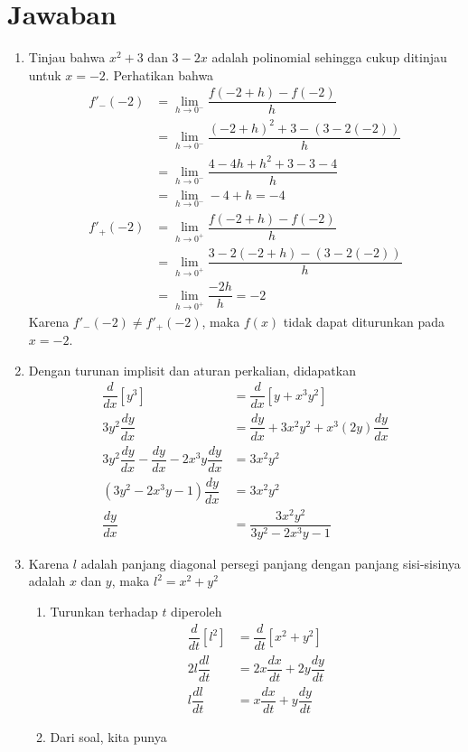 \documentclass{article}
\begin{document}
\section*{Jawaban}
\begin{enumerate}
	\item Tinjau bahwa $x^2+3$ dan $3-2x$ adalah polinomial sehingga cukup ditinjau untuk $x=-2$. Perhatikan bahwa
	\begin{align*}
	f'_-(-2) &= \lim_{h\rightarrow 0^-} \dfrac{f(-2+h)-f(-2)}{h}\\
	&= \lim_{h\rightarrow 0^-} \dfrac{(-2+h)^2+3-(3-2(-2))}{h}\\
	&= \lim_{h\rightarrow 0^-} \dfrac{4-4h+h^2+3-3-4}{h}\\
	&= \lim_{h\rightarrow 0^-} -4+h = -4\\
	f'_+(-2) &= \lim_{h\rightarrow 0^+} \dfrac{f(-2+h)-f(-2)}{h}\\
	&= \lim_{h\rightarrow 0^+} \dfrac{3-2(-2+h)-(3-2(-2))}{h}\\
	&= \lim_{h\rightarrow 0^+} \dfrac{-2h}{h} = -2
	\end{align*}
	Karena $f'_-(-2)\neq f'_+(-2)$, maka $f(x)$ tidak dapat diturunkan pada $x=-2$.
	\item Dengan turunan implisit dan aturan perkalian, didapatkan
	\begin{align*}
	\dfrac{d}{dx}[y^3] &= \dfrac{d}{dx}\left[y+x^3y^2\right]\\
	3y^2\dfrac{dy}{dx} &= \dfrac{dy}{dx}+3x^2y^2+x^3(2y)\dfrac{dy}{dx}\\
	3y^2\dfrac{dy}{dx}-\dfrac{dy}{dx}-2x^3y\dfrac{dy}{dx}&= 3x^2y^2\\
	(3y^2-2x^3y-1) \dfrac{dy}{dx} &= 3x^2y^2\\
	\dfrac{dy}{dx} &= \dfrac{3x^2y^2}{3y^2-2x^3y-1}
	\end{align*}
	\item Karena $l$ adalah panjang diagonal persegi panjang dengan panjang sisi-sisinya adalah $x$ dan $y$, maka $l^2=x^2+y^2$
	\begin{enumerate}
		\item Turunkan terhadap $t$ diperoleh 
	\begin{align*}
	\dfrac{d}{dt}[l^2]&=\dfrac{d}{dt}[x^2+y^2]\\
	2l\dfrac{dl}{dt} &= 2x\dfrac{dx}{dt}+2y\dfrac{dy}{dt}\\
	l\dfrac{dl}{dt} &= x\dfrac{dx}{dt}+y\dfrac{dy}{dt}
	\end{align*}
	\item Dari soal, kita punya
	\begin{align*}

\end{align*}
\end{enumerate}
\end{enumerate}
\end{document}
